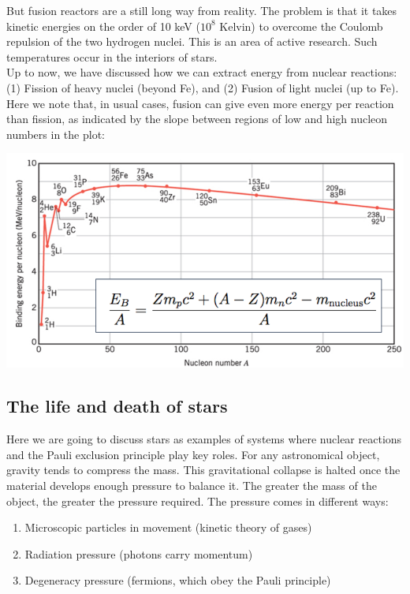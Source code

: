 \documentclass[11pt]{article}
\theoremstyle{break}
\theoremstyle{break}
\begin{document}
But fusion reactors are a still long way from reality. The problem is that it takes kinetic energies on the order of 10 keV ($10^8$ Kelvin) to overcome the Coulomb repulsion of the two hydrogen nuclei. This is an area of active research. Such temperatures occur in the interiors of stars.\\

Up to now, we have discussed how we can extract energy from nuclear reactions: (1) Fission of heavy nuclei (beyond Fe), and (2) Fusion of light nuclei (up to Fe). Here we note that, in usual cases, fusion can give even more energy per reaction than fission, as indicated by the slope between regions of low and high nucleon numbers in the plot:
\begin{center}
\includegraphics[scale=0.5]{FissionFusion}
\end{center}

\subsection{The life and death of stars}
Here we are going to discuss stars as examples of systems where nuclear reactions and the Pauli exclusion principle play key roles.  For any astronomical object, gravity tends to compress the mass. This gravitational collapse is halted once the material develops enough pressure to balance it. The greater the mass of the object, the greater the pressure required. The pressure comes in different ways:
\begin{enumerate}[topsep=3pt,itemsep=-1ex,partopsep=1ex,parsep=1ex]
\item Microscopic particles in movement (kinetic theory of gases)
\item Radiation pressure (photons carry momentum)
\item Degeneracy pressure (fermions, which obey the Pauli principle)
\end{enumerate}
\end{document}
